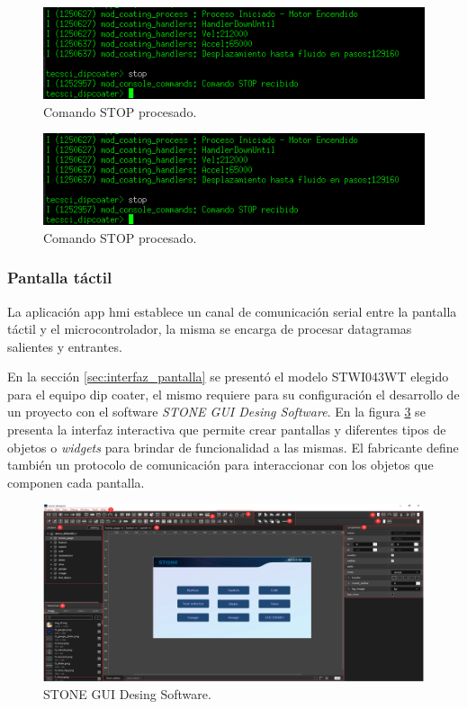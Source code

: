 \begin{figure}[h!]
	\centering
	\includegraphics[width=1\textwidth]{./Figures/consola_5.png}
	\caption{Comando STOP procesado.}
	\label{fig:consola_comando_false}
\end{figure}

\begin{figure}[h!]
	\centering
	\includegraphics[width=1\textwidth]{./Figures/consola_5.png}
	\caption{Comando STOP procesado.}
	\label{fig:consola_comando_false}
\end{figure}

\subsubsection{Pantalla táctil}

La aplicación app hmi establece un canal de comunicación serial entre la pantalla táctil y el microcontrolador, la misma se encarga de procesar datagramas salientes y entrantes. 

En la sección \ref{sec:interfaz_pantalla} se presentó el modelo STWI043WT elegido para el equipo dip coater, el mismo requiere para su configuración el desarrollo de un proyecto con el software \textit{STONE GUI Desing Software}. En la figura \ref{fig:stone_a} se presenta la interfaz interactiva que permite crear pantallas y diferentes tipos de objetos o \textit{widgets} para brindar de funcionalidad a las mismas. El fabricante define también un protocolo de comunicación \citep{web_protocolo_stone} para interaccionar con los objetos que componen cada pantalla.

\begin{figure}[h!]
	\centering
	\includegraphics[width=1\textwidth]{./Figures/stone_a.png}
	\caption{STONE GUI Desing Software.}
	\label{fig:stone_a}
\end{figure}



